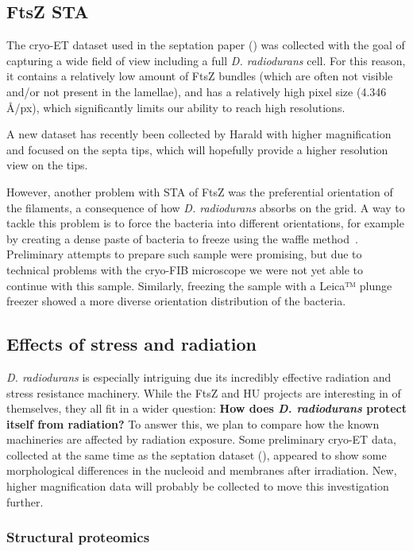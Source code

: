 \subsection{FtsZ STA}

The cryo-ET dataset used in the septation paper () was collected with the goal of capturing a wide field of view including a full \textit{D. radiodurans} cell.
For this reason, it contains a relatively low amount of FtsZ bundles (which are often not visible and/or not present in the lamellae), and has a relatively high pixel size (4.346 Å/px), which significantly limits our ability to reach high resolutions.

A new dataset has recently been collected by Harald with higher magnification and focused on the septa tips, which will hopefully provide a higher resolution view on the tips.

However, another problem with STA of FtsZ was the preferential orientation of the filaments, a consequence of how \textit{D. radiodurans} absorbs on the grid.
A way to tackle this problem is to force the bacteria into different orientations, for example by creating a dense paste of bacteria to freeze using the waffle method~\cite{kelleyWaffleMethodGeneral2022}.
Preliminary attempts to prepare such sample were promising, but due to technical problems with the cryo-FIB microscope we were not yet able to continue with this sample.
Similarly, freezing the sample with a Leica™ plunge freezer showed a more diverse orientation distribution of the bacteria.

\subsection{Effects of stress and radiation}

\textit{D. radiodurans} is especially intriguing due its incredibly effective radiation and stress resistance machinery.
While the FtsZ and HU projects are interesting in of themselves, they all fit in a wider question: \textbf{How does \textit{D. radiodurans} protect itself from radiation?}
To answer this, we plan to compare how the known machineries are affected by radiation exposure.
Some preliminary cryo-ET data, collected at the same time as the septation dataset (), appeared to show some morphological differences in the nucleoid and membranes after irradiation.
New, higher magnification data will probably be collected to move this investigation further.

\subsubsection{Structural proteomics}

